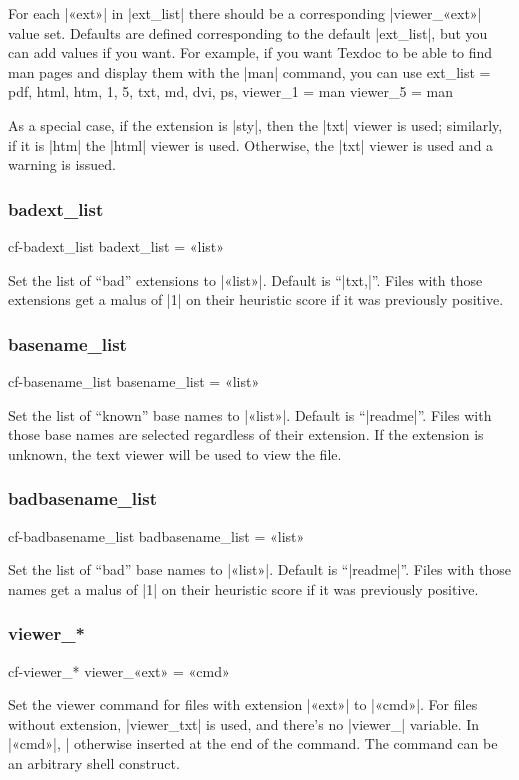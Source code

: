 \documentclass[a4paper,oneside]{scrartcl}
\makeatletter
\newif\ifframed
\newenvironment{cmdsubsub}[2]
  {\framedfalse \commandes\subsubsection{#1}{#2}}
  {\endcommandes}
\newenvironment{htcode}
  {\SaveVerbatim[samepage, gobble=2]{verbmat}}
  {
    \endSaveVerbatim
    \par\medskip\noindent\hspace*{\parindent}%
    \BUseVerbatim{verbmat}%
    \par\medskip\@endpetrue
  }
\makeatother
\begin{document}
For each |«ext»| in |ext_list| there should be a corresponding |viewer_«ext»|
value set. Defaults are defined corresponding to the default |ext_list|, but
you can add values if you want. For example, if you want Texdoc to be able
to find man pages and display them with the |man| command, you can use
\begin{htcode}
  ext_list = pdf, html, htm, 1, 5, txt, md, dvi, ps,
  viewer_1 = man
  viewer_5 = man
\end{htcode}

As a special case, if the extension is |sty|, then the |txt| viewer is used;
similarly, if it is |htm| the |html| viewer is used. Otherwise, the |txt|
viewer is used and a warning is issued.

\begin{cmdsubsub}{badext_list}{cf-badext_list}
  badext_list = «list»
\end{cmdsubsub}

Set the list of ``bad'' extensions to |«list»|. Default is ``|txt,|''. Files
with those extensions get a malus of |1| on their heuristic score if it was
previously positive.

\begin{cmdsubsub}{basename_list}{cf-basename_list}
  basename_list = «list»
\end{cmdsubsub}

Set the list of ``known'' base names to |«list»|. Default is ``|readme|''.
Files with those base names are selected regardless of their extension. If the
extension is unknown, the text viewer will be used to view the file.

\begin{cmdsubsub}{badbasename_list}{cf-badbasename_list}
  badbasename_list = «list»
\end{cmdsubsub}

Set the list of ``bad'' base names to |«list»|. Default is ``|readme|''. Files
with those names get a malus of |1| on their heuristic score if it was
previously positive.

\begin{cmdsubsub}{viewer_*}{cf-viewer_*}
  viewer_«ext» = «cmd»
\end{cmdsubsub}

Set the viewer command for files with extension |«ext»| to |«cmd»|. For files
without extension, |viewer_txt| is used, and there's no |viewer_| variable.
In |«cmd»|, |%
otherwise inserted at the end of the command. The command can be an arbitrary
shell construct.
\end{document}

